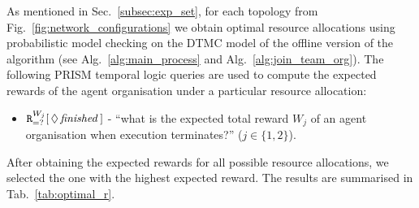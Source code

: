 \documentclass{llncs}
\begin{document}
As mentioned in Sec.~\ref{subsec:exp_set}, for each topology from Fig.~\ref{fig:network_configurations} we obtain optimal resource allocations using probabilistic model checking on the DTMC model of the offline version of the algorithm (see Alg.~\ref{alg:main_process} and Alg.~\ref{alg:join_team_org}). The following PRISM temporal logic queries are used to compute the expected rewards of the agent organisation under a particular resource allocation:
\begin{itemize}
 \item ${\tt R}_{=?}^{W_{j}}[\,\Diamond\,\mathit{finished}\,]$ -
``what is the expected total reward  $W_j$ of an agent organisation when execution terminates?'' ($j\in\{1,2\}$).
\end{itemize}
After obtaining the expected rewards for all possible resource allocations, we selected the one with the highest expected reward. The results are summarised in Tab.~\ref{tab:optimal_r}.
\begin{table}[t]
\centering
{}
\caption{Model comparison for different numbers of agents in a fully connected agent organisation for the offline version of Alg.~\ref{alg:join_team_org}.}
\label{tab:model_sizes}
\end{table}
\end{document}
